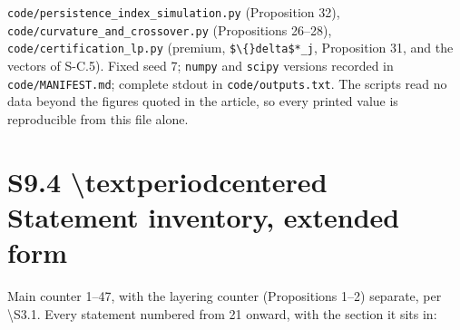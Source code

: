 \documentclass[11pt]{article}
\begin{document}
\texttt{code/persistence\_index\_simulation.py} (Proposition 32), \texttt{code/curvature\_and\_crossover.py} (Propositions 26--28), \texttt{code/certification\_lp.py} (premium, \texttt{\$\textbackslash\{\}delta\$*\_j}, Proposition 31, and the vectors of S-C.5). Fixed seed 7; \texttt{numpy} and \texttt{scipy} versions recorded in \texttt{code/MANIFEST.md}; complete stdout in \texttt{code/outputs.txt}. The scripts read no data beyond the figures quoted in the article, so every printed value is reproducible from this file alone.

\section*{S9.4 \textbackslash{}textperiodcentered{} Statement inventory, extended form}\label{s94-textperiodcentered{}-statement-inventory-extended-form}

Main counter 1--47, with the layering counter (Propositions 1--2) separate, per \textbackslash{}S{}3.1. Every statement numbered from 21 onward, with the section it sits in:
\end{document}
